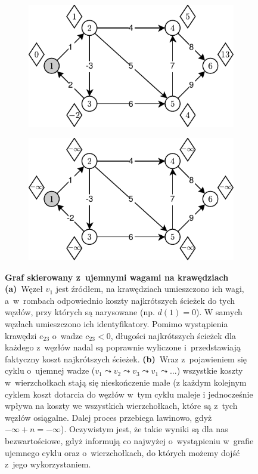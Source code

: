 \begin{figure}[!htbp]
	\centering
	\null\hfill
	\begin{subfigure}[b]{0.46\textwidth}
		\includegraphics[width=\textwidth]{Chapter_I/NEGATIVE-CYCLE-Example/a.pdf}
		\caption{}
		\label{fig:negativeCycle:a}
	\end{subfigure}%
	\hfill
	\begin{subfigure}[b]{0.46\textwidth}
		\includegraphics[width=\textwidth]{Chapter_I/NEGATIVE-CYCLE-Example/b.pdf}
		\caption{}
		\label{fig:negativeCycle:b}
	\end{subfigure}
	\hfill\null
	\caption{
		\textbf{Graf skierowany z~ujemnymi wagami na krawędziach}
		\textbf{(a)}~Węzeł $v_{1}$ jest źródłem, na krawędziach umieszczono ich wagi, a~w~rombach odpowiednio koszty najkrótszych ścieżek do tych węzłów, przy których są narysowane (np. $d \left( 1 \right) = 0$).
		W samych węzłach umieszczono ich identyfikatory.
		Pomimo wystąpienia krawędzi $e_{23}$ o~wadze $c_{23} < 0$, długości najkrótszych ścieżek dla każdego z~węzłów nadal są poprawnie wyliczone i~przedstawiają faktyczny koszt najkrótszych ścieżek.
		\textbf{(b)}~Wraz z~pojawieniem się cyklu o~ujemnej wadze ($v_{1} \leadsto v_{2} \leadsto v_{3} \leadsto v_{1} \leadsto \dots$) wszystkie koszty w~wierzchołkach stają się nieskończenie małe (z każdym kolejnym cyklem koszt dotarcia do węzłów w~tym cyklu maleje i jednocześnie wpływa na koszty we wszystkich wierzchołkach, które są z~tych węzłów osiągalne. Dalej proces przebiega lawinowo, gdyż $- \infty + n = - \infty$).
		Oczywistym jest, że takie wyniki są dla nas bezwartościowe, gdyż informują co najwyżej o~wystąpieniu w~grafie ujemnego cyklu oraz o~wierzchołkach, do których możemy dojść z~jego wykorzystaniem.
	}
	\label{fig:negativeCycle}
\end{figure}

